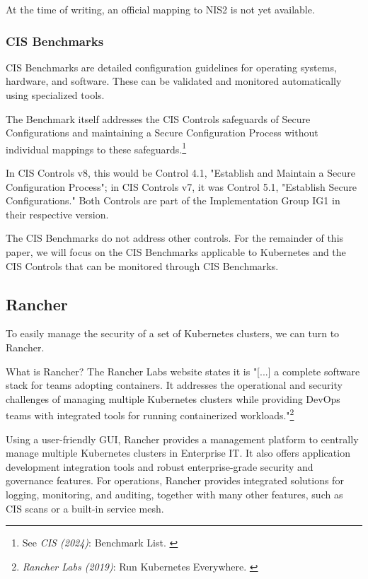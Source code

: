 At the time of writing, an official mapping to NIS2 is not yet available.

\subsubsection{CIS Benchmarks}

CIS Benchmarks are detailed configuration guidelines for operating systems, hardware, and software. These can be validated and monitored automatically using specialized tools.

The Benchmark itself addresses the CIS Controls safeguards of Secure
Configurations and maintaining a Secure Configuration Process without individual mappings to these safeguards.\footnote{See \textit{CIS (2024)}: Benchmark List. \cite{cisBenchmarks}}

In CIS Controls v8, this would be Control 4.1, "Establish and Maintain a Secure Configuration Process"; in CIS Controls v7, it was Control 5.1, "Establish Secure Configurations." Both Controls are part of the Implementation Group IG1 in their respective version.

The CIS Benchmarks do not address other controls. For the remainder of this paper, we will focus on the CIS Benchmarks applicable to Kubernetes and the CIS Controls that can be monitored through CIS Benchmarks.

\subsection{Rancher}

To easily manage the security of a set of Kubernetes clusters, we can turn to Rancher.

What is Rancher? The Rancher Labs website states it is "[...] a complete software stack for teams adopting containers. It addresses the operational and security challenges of managing multiple Kubernetes clusters while providing DevOps teams with integrated tools for running containerized workloads."\footnote{\textit{Rancher Labs (2019)}: Run Kubernetes Everywhere. \cite{rancher}}

Using a user-friendly GUI, Rancher provides a management platform to centrally manage multiple Kubernetes clusters in Enterprise IT. It also offers application development integration tools and robust enterprise-grade security and governance features. For operations, Rancher provides integrated solutions for logging, monitoring, and auditing, together with many other features, such as CIS scans or a built-in service mesh.

